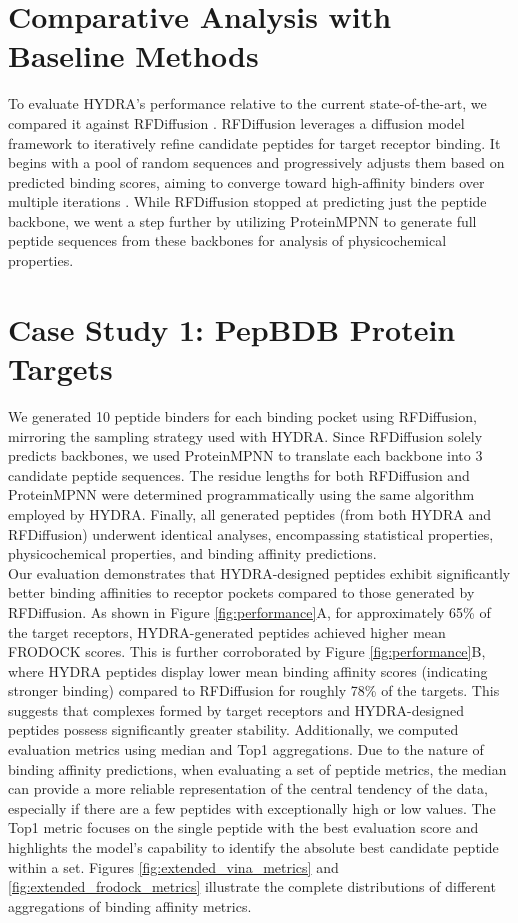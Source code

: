 \section{Comparative Analysis with Baseline Methods}
To evaluate HYDRA's performance relative to the current state-of-the-art, we compared it against RFDiffusion \cite{watson2023novo}. RFDiffusion leverages a diffusion model framework to iteratively refine candidate peptides for target receptor binding. It begins with a pool of random sequences and progressively adjusts them based on predicted binding scores, aiming to converge toward high-affinity binders over multiple iterations \cite{watson2023novo}. While RFDiffusion stopped at predicting just the peptide backbone, we went a step further by utilizing ProteinMPNN \cite{dauparas2022robust} to generate full peptide sequences from these backbones for analysis of physicochemical properties. \\

\section{Case Study 1: PepBDB Protein Targets}
We generated 10 peptide binders for each binding pocket using RFDiffusion, mirroring the sampling strategy used with HYDRA. Since RFDiffusion solely predicts backbones, we used ProteinMPNN to translate each backbone into 3 candidate peptide sequences. The residue lengths for both RFDiffusion and ProteinMPNN were determined programmatically using the same algorithm employed by HYDRA. Finally, all generated peptides (from both HYDRA and RFDiffusion) underwent identical analyses, encompassing statistical properties, physicochemical properties, and binding affinity predictions. \\

Our evaluation demonstrates that HYDRA-designed peptides exhibit significantly better binding affinities to receptor pockets compared to those generated by RFDiffusion. As shown in Figure \ref{fig:performance}A, for approximately 65\% of the target receptors, HYDRA-generated peptides achieved higher mean FRODOCK scores. This is further corroborated by Figure \ref{fig:performance}B, where HYDRA peptides display lower mean binding affinity scores (indicating stronger binding) compared to RFDiffusion for roughly 78\% of the targets. This suggests that complexes formed by target receptors and HYDRA-designed peptides possess significantly greater stability. 
Additionally, we computed evaluation metrics using median and Top1 aggregations. Due to the nature of binding affinity predictions, when evaluating a set of peptide metrics, the median can provide a more reliable representation of the central tendency of the data, especially if there are a few peptides with exceptionally high or low values. The Top1 metric focuses on the single peptide with the best evaluation score and highlights the model's capability to identify the absolute best candidate peptide within a set. Figures \ref{fig:extended_vina_metrics} and \ref{fig:extended_frodock_metrics} illustrate the complete distributions of different aggregations of binding affinity metrics. \\

